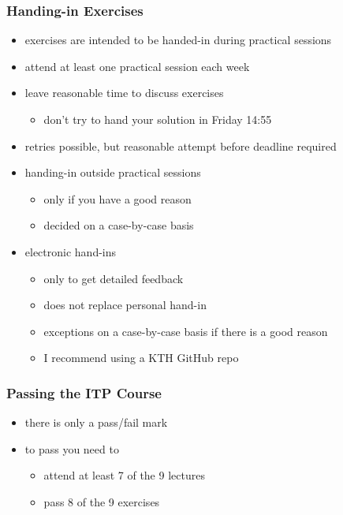 \begin{frame}
\frametitle{Handing-in Exercises}

\begin{itemize}
\item exercises are intended to be handed-in during practical sessions
\item attend at least one practical session each week
\item leave reasonable time to discuss exercises
\begin{itemize}
\item don't try to hand your solution in Friday 14:55
\end{itemize}
\item retries possible, but reasonable attempt before deadline required
\item handing-in outside practical sessions
\begin{itemize}
\item only if you have a good reason
\item decided on a case-by-case basis
\end{itemize}
\item electronic hand-ins 
\begin{itemize}
\item only to get detailed feedback
\item does not replace personal hand-in
\item exceptions on a case-by-case basis if there is a good reason
\item I recommend using a KTH GitHub repo
\end{itemize}
\end{itemize}
\end{frame}


\begin{frame}
\frametitle{Passing the ITP Course}

\begin{itemize}
\item there is only a pass/fail mark
\item to pass you need to
\begin{itemize}
\item attend at least 7 of the 9 lectures
\item pass 8 of the 9 exercises 
\end{itemize}
\end{itemize}
\end{frame}

